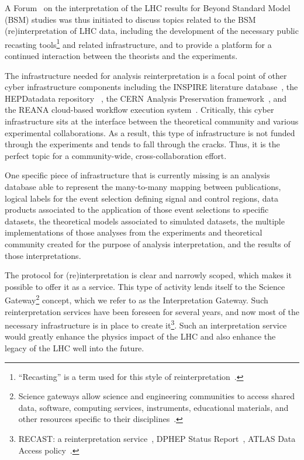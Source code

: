 \documentclass[12pt,a4paper]{article}
\begin{document}
A Forum~\cite{LHCInterpretationForum} on the interpretation of the LHC results for Beyond Standard Model (BSM) studies was thus initiated to discuss topics related to the BSM (re)interpretation of LHC data, including the development of the necessary public recasting tools\footnote{``Recasting'' is a term used for this style of reinterpretation~\cite{Cranmer:1299950}.} and related infrastructure, and to provide a platform for a continued interaction between the theorists and the experiments. 

The infrastructure needed for analysis reinterpretation is a focal point of other cyber infrastructure components including the INSPIRE literature database~\cite{INSPIRE}, the HEPDatadata repository~\cite{HEPDataRepo} , the CERN Analysis Preservation framework~\cite{CAP}, and the REANA cloud-based workflow execution system~\cite{REANA}. Critically, this cyber infrastructure sits at the interface between the theoretical community and various experimental collaborations. As a result, this type of infrastructure is not funded through the experiments and tends to fall through the cracks. Thus, it is the perfect topic for a community-wide, cross-collaboration effort.

One specific piece of infrastructure that is currently missing is an analysis database able to represent the many-to-many mapping between publications, logical labels for the event selection defining signal and control regions, data products associated to the application of those event selections to specific datasets, the theoretical models associated to simulated datasets, the multiple implementations of those analyses from the experiments and theoretical community created for the purpose of analysis interpretation, and the results of those interpretations.

The protocol for (re)interpretation is clear and narrowly scoped, which makes it possible to offer it as a service. This type of activity lends itself to the Science Gateway\footnote{Science gateways allow science and engineering communities to access shared data, software, computing services, instruments, educational materials, and other resources specific to their disciplines~\cite{SciGateway}.} concept, which we refer to as the Interpretation Gateway. Such reinterpretation services have been foreseen for several years, and now most of the necessary infrastructure is in place to create it\footnote{RECAST: a reinterpretation service~\cite{Cranmer:1299950}, DPHEP Status Report~\cite{Akopov:2012bm}, ATLAS Data Access policy~\cite{ATL-CB-PUB-2015-001}.}. Such an interpretation service would greatly enhance the physics impact of the LHC and also enhance the legacy of the LHC well into the future.
\end{document}
